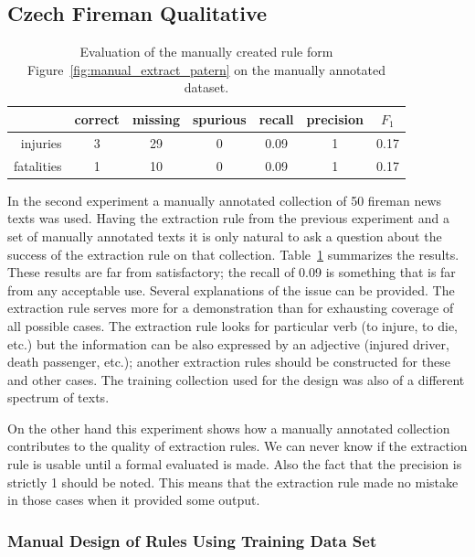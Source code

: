 \subsection{Czech Fireman Qualitative}


\begin{table}
	\centering
	\begin{tabular}{|r|c|c|c|c|c|c|}
		\hline
		 & correct & missing & spurious & recall & precision & $F_1$\\
		\hline
		injuries & 3 & 29 & 0 & 0.09 & 1 & 0.17\\
		\hline
		fatalities & 1 & 10 & 0 & 0.09 & 1 & 0.17\\
		\hline
	\end{tabular}
	\caption{Evaluation of the manually created rule form Figure~\ref{fig:manual_extract_patern} on the manually annotated dataset.}
	\label{tab:manual_extract_patern_eval}
\end{table}



In the second experiment a manually annotated collection of 50 fireman news texts was used. Having the extraction rule from the previous experiment and a set of manually annotated texts it is only natural to ask a question about the success of the extraction rule on that collection. Table~\ref{tab:manual_extract_patern_eval} summarizes the results. These results are far from satisfactory; the recall of 0.09 is something that is far from any acceptable use. Several explanations of the issue can be provided. The extraction rule serves more for a demonstration than for exhausting coverage of all possible cases. The extraction rule looks for particular verb (to injure, to die, etc.) but the information can be also expressed by an adjective (injured driver, death passenger, etc.); another extraction rules should be constructed for these and other cases. The training collection used for the design was also of a different spectrum of texts.



On the other hand this experiment shows how a manually annotated collection contributes to the quality of extraction rules. We can never know if the extraction rule is usable until a formal evaluated is made. Also the fact that the precision is strictly 1 should be noted. This means that the extraction rule made no mistake in those cases when it provided some output.



\subsubsection{Manual Design of Rules Using Training Data Set}  


